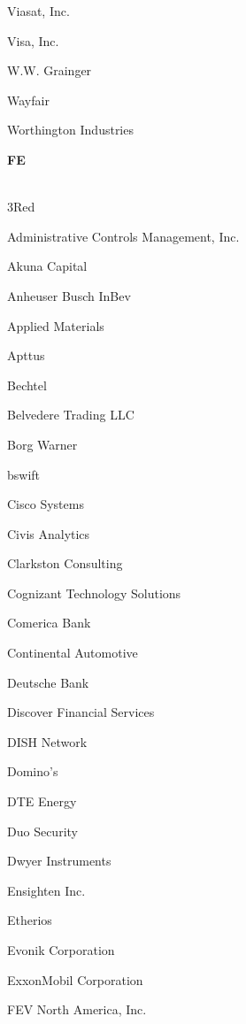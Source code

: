 \documentclass[twoside]{article}
\begin{document}
\begin{center}
\begin{multicols}{5}
\begin{FlushLeft}
\begin{compactitem}
\item Viasat, Inc.
\item Visa, Inc.
\item W.W. Grainger
\item Wayfair
\item Worthington Industries
\end{compactitem}
        \end{FlushLeft}
        \vspace{1em}
        {\fontsize{14}{16}\selectfont \bf FE}\\
        \vspace{-1em}
        ~\hrulefill~
        \vspace{-.9em}
        \begin{FlushLeft}
        \begin{compactitem}
        \item 3Red
\item Administrative Controls Management, Inc.
\item Akuna Capital
\item Anheuser Busch InBev
\item Applied Materials
\item Apttus
\item Bechtel
\item Belvedere Trading LLC
\item Borg Warner
\item bswift
\item Cisco Systems
\item Civis Analytics
\item Clarkston Consulting
\item Cognizant Technology Solutions
\item Comerica Bank
\item Continental Automotive
\item Deutsche Bank
\item Discover Financial Services
\item DISH Network
\item Domino's
\item DTE Energy
\item Duo Security
\item Dwyer Instruments
\item Ensighten Inc.
\item Etherios
\item Evonik Corporation
\item ExxonMobil Corporation
\item FEV North America, Inc.

\end{compactitem}
\end{FlushLeft}
\end{multicols}
\end{center}
\end{document}
